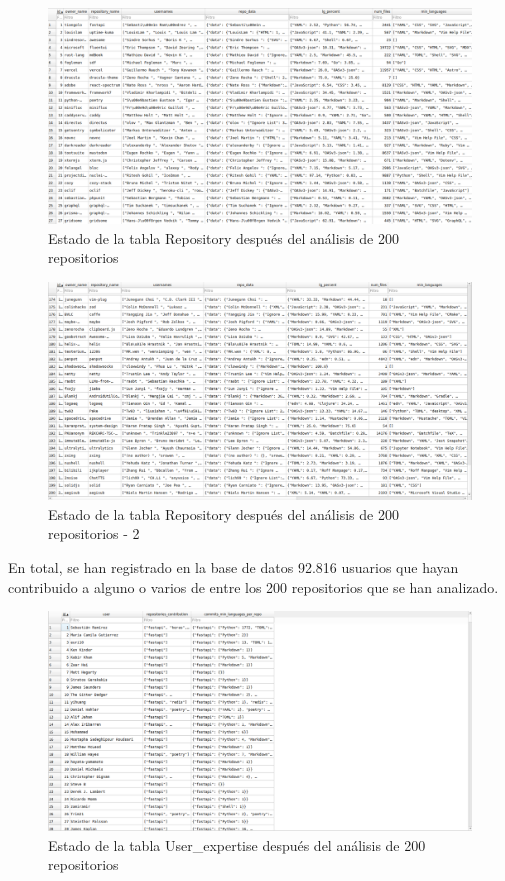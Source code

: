 \documentclass[a4paper, 12pt]{book}
\begin{document}
\begin{figure}[H]
  \centering
  \includegraphics[width=1\textwidth]{img/tablarepo1.png}
  \caption{Estado de la tabla Repository después del análisis de 200 repositorios}
  \label{figura:repoafter1}
\end{figure}

\begin{figure}[H]
  \centering
  \includegraphics[width=1\textwidth]{img/tablarepo3.png}
  \caption{Estado de la tabla Repository después del análisis de 200 repositorios - 2}
  \label{figura:repoafter2}
\end{figure}

En total, se han registrado en la base de datos 92.816 usuarios que hayan contribuido a alguno o varios de entre los 200 repositorios que se han analizado.

\begin{figure}[H]
  \centering
  \includegraphics[width=1\textwidth]{img/tablauserexp1.png}
  \caption{Estado de la tabla User\_expertise después del análisis de 200 repositorios}
  \label{figura:userexpafter1}
\end{figure}
\end{document}
